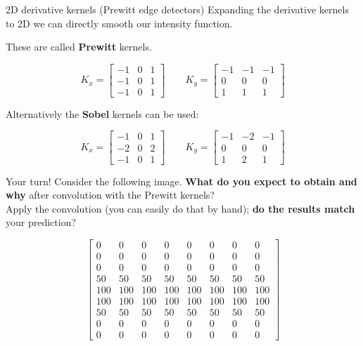 \documentclass[9pt, aspectratio=169]{beamer}
\begin{document}
\begin{frame}
    {2D derivative kernels (Prewitt edge detectors)}
    Expanding the derivative kernels to 2D we can directly smooth our intensity function.

    These are called \textbf{Prewitt} kernels.

    $$K_x = \begin{bmatrix}-1&0&1\\-1&0&1\\-1&0&1\end{bmatrix} \qquad K_y = \begin{bmatrix}-1&-1&-1\\0&0&0\\1&1&1\end{bmatrix}$$

    Alternatively the \textbf{Sobel} kernels can be used:

    $$K_x = \begin{bmatrix}-1&0&1\\-2&0&2\\-1&0&1\end{bmatrix} \qquad K_y = \begin{bmatrix}-1&-2&-1\\0&0&0\\1&2&1\end{bmatrix}$$
\end{frame}

\begin{frame}
    {Your turn!}
    Consider the following image. \textbf{What do you expect to obtain and why} after convolution with the Prewitt kernels?\\
    Apply the convolution (you can easily do that by hand); \textbf{do the results match} your prediction?

    $$\begin{bmatrix}0   & 0   & 0   & 0   & 0   & 0   & 0   & 0   \\
            0   & 0   & 0   & 0   & 0   & 0   & 0   & 0   \\
            0   & 0   & 0   & 0   & 0   & 0   & 0   & 0   \\
            50  & 50  & 50  & 50  & 50  & 50  & 50  & 50  \\
            100 & 100 & 100 & 100 & 100 & 100 & 100 & 100 \\
            100 & 100 & 100 & 100 & 100 & 100 & 100 & 100 \\
            50  & 50  & 50  & 50  & 50  & 50  & 50  & 50  \\
            0   & 0   & 0   & 0   & 0   & 0   & 0   & 0   \\
            0   & 0   & 0   & 0   & 0   & 0   & 0   & 0
        \end{bmatrix}$$
\end{frame}
\end{document}
